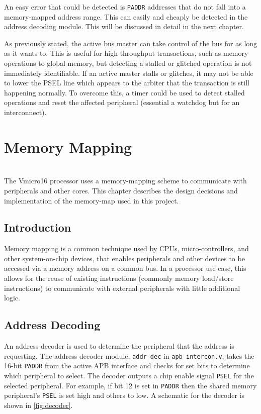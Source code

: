 An easy error that could be detected is \verb|PADDR| addresses that do not fall into a memory-mapped address range. This can easily and cheaply be detected in the address decoding module. This will be discussed in detail in the next chapter.

As previously stated, the active bus master can take control of the bus for as long as it wants to. This is useful for high-throughput transactions, such as memory operations to global memory, but detecting a stalled or glitched operation is not immediately identifiable. If an active master stalls or glitches, it may not be able to lower the PSEL line which appears to the arbiter that the transaction is still happening normally. To overcome this, a timer could be used to detect stalled operations and reset the affected peripheral (essential a watchdog but for an interconnect). 

\chapter{Memory Mapping}
{%
\startcontents[chapters]
}
\noindent\\
The Vmicro16 processor uses a memory-mapping scheme to communicate with peripherals and other cores. This chapter describes the design decisions and implementation of the memory-map used in this project.

\section{Introduction}
Memory mapping is a common technique used by CPUs, micro-controllers, and other system-on-chip devices, that enables peripherals and other devices to be accessed via a memory address on a common bus. In a processor use-case, this allows for the reuse of existing instructions (commonly memory load/store instructions) to communicate with external peripherals with little additional logic.

\section{Address Decoding}
An address decoder is used to determine the peripheral that the address is requesting. The address decoder module, \verb|addr_dec| in \verb|apb_intercon.v|, takes the 16-bit \verb|PADDR| from the active APB interface and checks for set bits to determine which peripheral to select. The decoder outputs a chip enable signal \verb|PSEL| for the selected peripheral. For example, if bit 12 is set in \verb|PADDR| then the shared memory peripheral's \verb|PSEL| is set high and others to low. A schematic for the decoder is shown in \cref{fig:decoder}.

